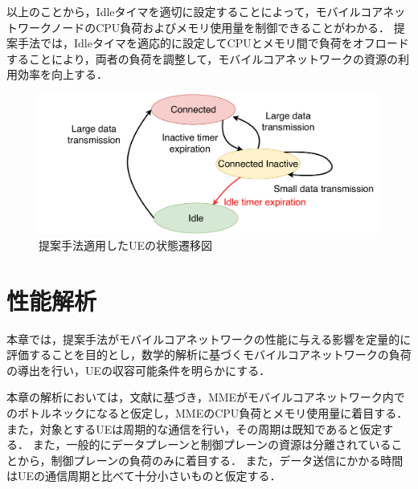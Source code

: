 \documentclass[technicalreport]{ieicej-rev}
\begin{document}
以上のことから，Idleタイマを適切に設定することによって，モバイルコアネットワークノードのCPU負荷およびメモリ使用量を制御できることがわかる．
提案手法では，Idleタイマを適応的に設定してCPUとメモリ間で負荷をオフロードすることにより，両者の負荷を調整して，モバイルコアネットワークの資源の利用効率を向上する．

\begin{figure}[!t]
  \centering
  \includegraphics[width=1.0\hsize]{state_change_propose.pdf}
  \caption{提案手法適用したUEの状態遷移図}
  \label{state_change_propose}
\end{figure}


\section{性能解析}
\label{sec:解析}
本章では，提案手法がモバイルコアネットワークの性能に与える影響を定量的に評価することを目的とし，数学的解析に基づくモバイルコアネットワークの負荷の導出を行い，UEの収容可能条件を明らかにする．

本章の解析においては，文献\cite{ACloudNativeSolutionforDynamicAutoScalingofMMEinLTE}に基づき，MMEがモバイルコアネットワーク内でのボトルネックになると仮定し，MMEのCPU負荷とメモリ使用量に着目する．
また，対象とするUEは周期的な通信を行い，その周期は既知であると仮定する．
また，一般的にデータプレーンと制御プレーンの資源は分離されていることから，制御プレーンの負荷のみに着目する．
また，データ送信にかかる時間はUEの通信周期と比べて十分小さいものと仮定する．
\end{document}
